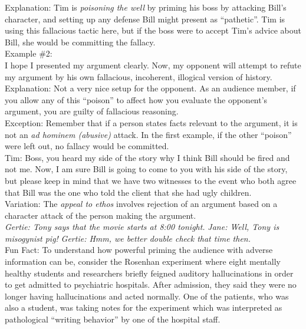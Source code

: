 \documentclass[a4paper,12pt,single,pdftex]{scrartcl}
\begin{document}
    
      Explanation: Tim is {\it poisoning the well} by priming his boss by attacking Bill’s character, and setting up any defense Bill might present as “pathetic”.  Tim is using this fallacious tactic here, but if the boss were to accept Tim’s advice about Bill, she would be committing the fallacy.
    \\

    
      Example \#2:
    \\

    
      I hope I presented my argument clearly.  Now, my opponent will attempt to refute my argument by his own fallacious, incoherent, illogical version of history.
    \\

    
      Explanation: Not a very nice setup for the opponent.  As an audience member, if you allow any of this “poison” to affect how you evaluate the opponent’s argument, you are guilty of fallacious reasoning.
    \\

    
      Exception: Remember that if a person states facts relevant to the argument, it is not an {\it ad hominem (abusive)} attack.  In the first example, if the other “poison” were left out, no fallacy would be committed.
    \\

    
      Tim: Boss, you heard my side of the story why I think Bill should be fired and not me.  Now, I am sure Bill is going to come to you with his side of the story, but please keep in mind that we have two witnesses to the event who both agree that Bill was the one who told the client that she had ugly children.
    \\

    
      Variation: The {\em appeal to ethos} involves rejection of an argument based on a character attack of the person making the argument.
    \\

    
      {\em Gertie: Tony says that the movie starts at 8:00 tonight.} \newline
{\em Jane: Well, Tony is misogynist pig!} \newline
{\em Gertie: Hmm, we better double check that time then. }
    \\

    
      Fun Fact: To understand how powerful priming the audience with adverse information can be, consider the Rosenhan experiment where eight mentally healthy students and researchers briefly feigned auditory hallucinations in order to get admitted to psychiatric hospitals. After admission, they said they were no longer having hallucinations and acted normally. One of the patients, who was also a student, was taking notes for the experiment which was interpreted as pathological “writing behavior” by one of the hospital staff. 
    \\
\end{document}
